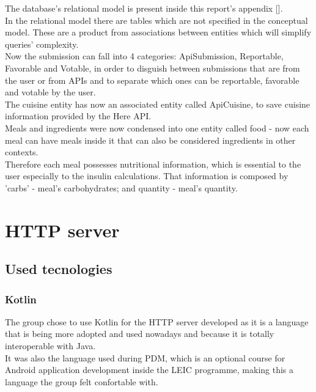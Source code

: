 The database's relational model is present inside this report's appendix [].\\

In the relational model there are tables which are not specified in the conceptual model.
These are a product from associations between entities which will simplify queries' complexity.\\

Now the submission can fall into 4 categories: ApiSubmission, Reportable, Favorable and Votable, in order to disguish between submissions that
are from the user or from APIs and to separate which ones can be reportable, favorable and votable by the user.\\

The cuisine entity has now an associated entity called ApiCuisine, to save cuisine information provided by the Here API.\\

Meals and ingredients were now condensed into one entity called food - now each meal can have meals inside it that can also be considered
ingredients in other contexts.\\

Therefore each meal possesses nutritional information, which is essential to the user especially to the insulin calculations. That information is composed by
'carbs' - meal's carbohydrates; and quantity - meal's quantity.\\

\section{HTTP server}

\subsection{Used tecnologies}

\subsubsection{Kotlin}

The group chose to use Kotlin for the HTTP server developed as it is a language that is being more adopted and used nowadays and because it is totally 
interoperable with Java.\\

It was also the language used during PDM, which is an optional course for Android application development inside the LEIC programme, 
making this a language the group felt confortable with.\\

